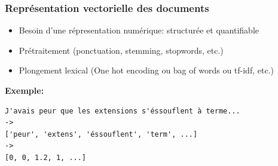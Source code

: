 \documentclass{beamer}
\begin{document}

\begin{frame}[fragile]
\frametitle{Représentation vectorielle des documents}
\begin{itemize}
    \item Besoin d'une répresentation numérique: structurée et quantifiable 
    \item Prétraitement (ponctuation, stemming, stopwords, etc.)
    \item Plongement lexical (One hot encoding ou bag of words ou tf-idf, etc.)
\end{itemize}
\textbf{Exemple:}
\begin{verbatim}
J'avais peur que les extensions s'éssouflent à terme...
->
['peur', 'extens', 'éssouflent', 'term', ...]
->
[0, 0, 1.2, 1, ...]
\end{verbatim}
\end{frame}


\end{document}
